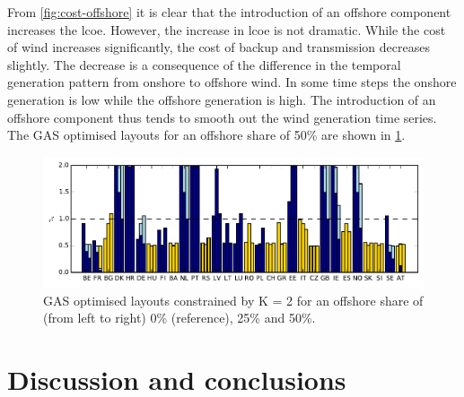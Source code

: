 \documentclass[a4paper, 5p, sort&compress]{elsarticle}%
\begin{document}
From \cref{fig:cost-offshore} it is clear that the introduction of an
offshore component increases the \gls{lcoe}. However, the increase in \gls{lcoe}
is not dramatic. While the cost of wind increases
significantly, the cost of backup and transmission decreases
slightly. The decrease is a consequence of the difference in the
temporal generation pattern from onshore to offshore wind. In some
time steps the onshore generation is low while the offshore generation
is high. The introduction of an offshore component thus tends to
smooth out the wind generation time series. %
The GAS optimised layouts for an offshore share of 50\% are shown in
\cref{fig:layout-offshore}.

\begin{figure}[t!]
  \centering
  \includegraphics[width = 2\columnwidth, center]{offshoreLayouts-new}
  \caption{GAS optimised layouts constrained by K = 2 for an offshore
    share of (from left to right) 0\% (reference), 25\% and 50\%.} %
  \label{fig:layout-offshore}
\end{figure}

\section{Discussion and conclusions}
\label{sec:four}
\end{document}
